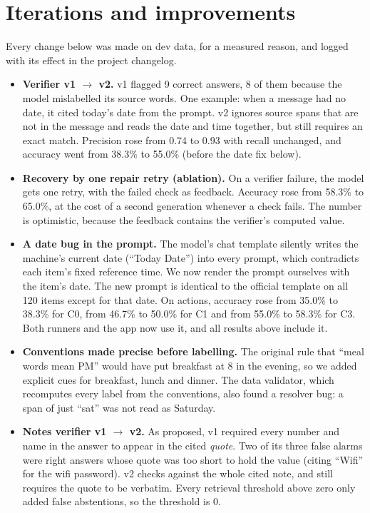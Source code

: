 \documentclass[10pt,letterpaper]{article}
\begin{document}
\section{Iterations and improvements}
Every change below was made on dev data, for a measured reason, and logged with its effect in the project changelog.
\begin{itemize}
  \item \textbf{Verifier v1 $\rightarrow$ v2.} v1 flagged 9 correct answers, 8 of them because the model mislabelled its source words. One example: when a message had no date, it cited today's date from the prompt. v2 ignores source spans that are not in the message and reads the date and time together, but still requires an exact match. Precision rose from 0.74 to 0.93 with recall unchanged, and accuracy went from 38.3\% to 55.0\% (before the date fix below).
  \item \textbf{Recovery by one repair retry (ablation).} On a verifier failure, the model gets one retry, with the failed check as feedback. Accuracy rose from 58.3\% to 65.0\%, at the cost of a second generation whenever a check fails. The number is optimistic, because the feedback contains the verifier's computed value.
  \item \textbf{A date bug in the prompt.} The model's chat template silently writes the machine's current date (``Today Date'') into every prompt, which contradicts each item's fixed reference time. We now render the prompt ourselves with the item's date. The new prompt is identical to the official template on all 120 items except for that date. On actions, accuracy rose from 35.0\% to 38.3\% for C0, from 46.7\% to 50.0\% for C1 and from 55.0\% to 58.3\% for C3. Both runners and the app now use it, and all results above include it.
  \item \textbf{Conventions made precise before labelling.} The original rule that ``meal words mean PM'' would have put breakfast at 8 in the evening, so we added explicit cues for breakfast, lunch and dinner. The data validator, which recomputes every label from the conventions, also found a resolver bug: a span of just ``sat'' was not read as Saturday.
  \item \textbf{Notes verifier v1 $\rightarrow$ v2.} As proposed, v1 required every number and name in the answer to appear in the cited \emph{quote}. Two of its three false alarms were right answers whose quote was too short to hold the value (citing ``Wifi'' for the wifi password). v2 checks against the whole cited note, and still requires the quote to be verbatim. Every retrieval threshold above zero only added false abstentions, so the threshold is 0.

\end{itemize}
\end{document}

